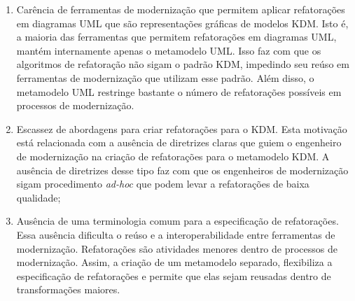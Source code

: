 \begin{enumerate}

\item Carência de ferramentas de modernização que permitem aplicar refatorações em diagramas UML que são representações gráficas de modelos KDM. Isto é, a maioria das ferramentas que permitem refatorações em diagramas UML, mantém internamente apenas o metamodelo UML. Isso faz com que os algoritmos de refatoração não sigam o padrão KDM, impedindo seu reúso em ferramentas de modernização que utilizam esse padrão. Além disso, o metamodelo UML restringe bastante o número de refatorações possíveis em processos de modernização.


\item Escassez de abordagens para criar refatorações para o KDM. Esta motivação está relacionada com a ausência de diretrizes claras que guiem o engenheiro de modernização na criação de refatorações para o metamodelo KDM. A ausência de diretrizes desse tipo faz com que os engenheiros de modernização sigam procedimento \textit{ad-hoc} que podem levar a refatorações de baixa qualidade;






\item Ausência de uma terminologia comum para a especificação de refatorações. Essa ausência dificulta o reúso e a interoperabilidade entre ferramentas de modernização. Refatorações são atividades menores dentro de processos de modernização. Assim, a criação de um metamodelo separado, flexibiliza a especificação de refatorações e permite que elas sejam reusadas dentro de transformações maiores. %



\end{enumerate}

